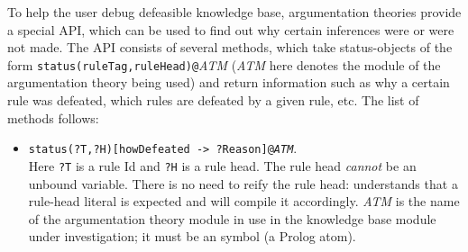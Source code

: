 \documentclass[11pt]{article}
\newcommand{\ERGO}{\mbox{\smaller{\ensuremath{\cal{E}}\smaller{{\sc{RGO}}}}}\xspace}
\newcommand{\FLSYSTEM}{\ERGO}
\begin{document}
To help the user debug defeasible knowledge base, argumentation
theories provide a special API, which can be used to find out
why certain inferences were or were not made.
The API consists of several methods, which take status-objects of the form
\texttt{status(ruleTag,ruleHead)@}\emph{ATM} (\emph{ATM} here denotes the
module of the argumentation theory being used)
and return information such as why a certain
rule was defeated, which rules are defeated by a given rule, etc.
The list of methods follows:
\begin{itemize}
\item  {\tt status(?T,?H)[howDefeated -> ?Reason]@\emph{ATM}}.\\
  Here {\tt ?T} is a rule Id and {\tt ?H} is a rule head. The rule head
  \emph{cannot} be an unbound  variable. There is no need to reify the rule head: \FLSYSTEM
  understands that a rule-head literal is expected and will compile it
  accordingly.  
  \emph{ATM}  is the name of the argumentation theory module
  in use in the knowledge base module under investigation; it must be an
  \ERGO symbol (a Prolog atom).


\end{itemize}
\end{document}
